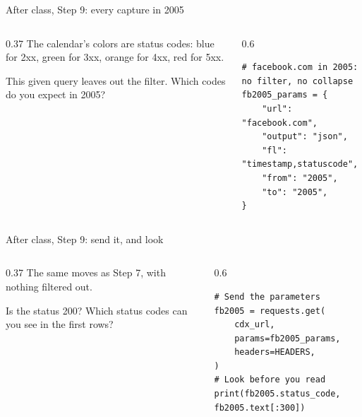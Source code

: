 \documentclass[9pt,aspectratio=169]{beamer}
\begin{document}
\begin{frame}[fragile]{After class, Step 9: every capture in 2005}
    \begin{columns}[T]
        \begin{column}{0.37\textwidth}
            The calendar's colors are status codes: blue for 2xx, green for 3xx, orange for 4xx, red for 5xx.

            \medskip
            This given query leaves out the filter. Which codes do you expect in 2005?
        \end{column}
        \begin{column}{0.6\textwidth}
\begin{lstlisting}
# facebook.com in 2005: no filter, no collapse
fb2005_params = {
    "url": "facebook.com",
    "output": "json",
    "fl": "timestamp,statuscode",
    "from": "2005",
    "to": "2005",
}
\end{lstlisting}
        \end{column}
    \end{columns}
\end{frame}

\begin{frame}[fragile]{After class, Step 9: send it, and look}
    \begin{columns}[T]
        \begin{column}{0.37\textwidth}
            The same moves as Step 7, with nothing filtered out.

            \medskip
            Is the status 200? Which status codes can you see in the first rows?
        \end{column}
        \begin{column}{0.6\textwidth}
\begin{lstlisting}
# Send the parameters
fb2005 = requests.get(
    cdx_url,
    params=fb2005_params,
    headers=HEADERS,
)
# Look before you read
print(fb2005.status_code, fb2005.text[:300])
\end{lstlisting}
        \end{column}
    \end{columns}
\end{frame}
\end{document}
